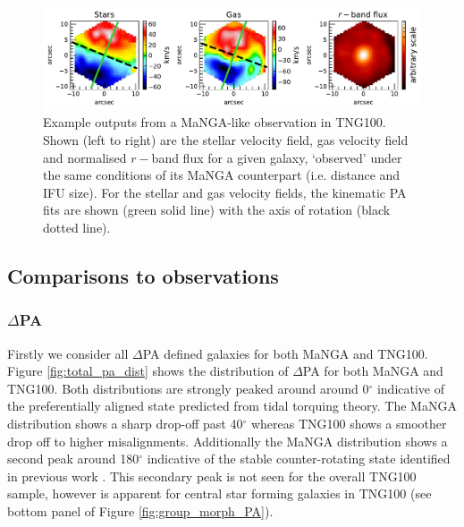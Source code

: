 \begin{figure}
	\includegraphics[width=\linewidth]{misalignment_TNG/example_kinematics.pdf}
    \caption{Example outputs from a MaNGA-like observation in TNG100. Shown (left to right) are the stellar velocity field, gas velocity field and normalised $r-$band flux for a given galaxy, `observed' under the same conditions of its MaNGA counterpart (i.e. distance and IFU size). For the stellar and gas velocity fields, the kinematic PA fits are shown (green solid line) with the axis of rotation (black dotted line).}
    \label{fig:example_obs}
\end{figure}

\subsection{Comparisons to observations} \label{sec:manga_tng_comp}
\subsubsection{$\Delta$PA}
Firstly we consider all $\Delta$PA defined galaxies for both MaNGA and TNG100. Figure \ref{fig:total_pa_dist} shows the distribution of $\Delta$PA for both MaNGA and TNG100. Both distributions are strongly peaked around around 0$^{\circ}$ indicative of the preferentially aligned state predicted from tidal torquing theory. The MaNGA distribution shows a sharp drop-off past 40$^{\circ}$ whereas TNG100 shows a smoother drop off to higher misalignments. Additionally the MaNGA distribution shows a second peak around 180$^{\circ}$ indicative of the stable counter-rotating state identified in previous work \citep[e.g.][]{chen2016}. This secondary peak is not seen for the overall TNG100 sample, however is apparent for central star forming galaxies in TNG100 (see bottom panel of Figure \ref{fig:group_morph_PA}). 

